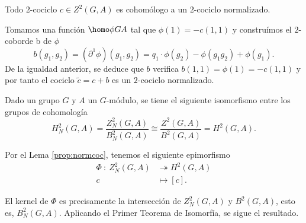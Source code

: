 \begin{lema}\label{prop:normcoc}
	Todo $2$-cociclo $c\in Z^2(G,A)$ es cohomólogo a un $2$-cociclo normalizado. %
	\begin{demostracion}
		Tomamos una función $\homo \phi G A$ tal que $\phi(1) = -c(1,1)$ y construímos el $2$-coborde b de $\phi$
		\begin{equation*}
			b(g_1,g_2) = (\partial^1 \phi)(g_1,g_2) =  q_1\cdot \phi(g_2) - \phi(g_1g_2) + \phi(g_1).
		\end{equation*}
		De la igualdad anterior, se deduce  que $b$ verifica $b(1,1) = \phi(1) = -c(1,1)$ y por tanto el cociclo $\tilde c = c+b$ es un $2$-cociclo normalizado.
	\end{demostracion}
\end{lema}

\begin{teorema}\label{thm:h2hn2}
	Dado un grupo $G$ y $A$ un $G$-módulo, se tiene el siguiente isomorfismo entre los grupos de cohomología
	\begin{equation}
		H^2_N(G,A) = \frac{Z^2_N(G,A)}{B^2_N(G,A)} \cong \frac{Z^2(G,A)}{B^2(G,A)} = H^2(G,A).
	\end{equation}
	\begin{demostracion}
		Por el Lema \ref{prop:normcoc}, tenemos el siguiente epimorfismo
		\begin{align*}
			\Phi \ \colon \ Z^2_N(G,A) &\twoheadrightarrow H^2(G,A) \\
			c \ &\mapsto [c].
		\end{align*}
		
		El kernel de $\Phi$ es precisamente la intersección de $Z^2_N(G,A)$ y $B^2(G,A)$, esto es, $B^2_N(G,A)$. Aplicando el Primer Teorema de Isomorfía, se sigue el resultado.
	\end{demostracion}
\end{teorema}

